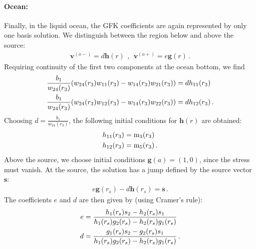\documentclass[12pt,a4paper]{article}
\begin{document}
\paragraph{Ocean:}
Finally, in the liquid ocean, the GFK coefficients are again represented by only one basis solution. We distinguish between the region below and above the source:
\begin{align}
\mathbf{v}^{(o-)} = d\mathbf{h}(r) \ \,,\ \ \mathbf{v}^{(o+)} = e\mathbf{g}(r) \,.
\end{align}
Requiring continuity of the first two components at the ocean bottom, we find
\begin{align}
\frac{b_1}{w_{24}(r_3)}  (w_{24}(r_3)w_{11}(r_3) - w_{14}(r_3) w_{21}(r_3)) &= dh_{11}(r_3) \\ \notag
\frac{b_1}{w_{24}(r_3)}  (w_{24}(r_3)w_{12}(r_3) - w_{14}(r_3) w_{22}(r_3)) &= dh_{12}(r_3)\,.
\end{align}
Choosing $d = \frac{b_1}{w_{24}(r_3)}$, the following initial conditions for $\mathbf{h}(r)$ are obtained:
\begin{align}
h_{11}(r_3) &= \mathrm{m}_3(r_3) \\\notag
h_{12}(r_3) &= \mathrm{m}_5(r_3) \,.
\end{align}
Above the source, we choose initial conditions $\mathbf{g}(a) = (1,0)$, since the stress must vanish. At the source, the solution has a jump defined by the source vector $\mathbf{s}$:
\begin{align}
e\mathbf{g}(r_s)-d\mathbf{h}(r_s) = \mathbf{s} \,.
\end{align}
The coefficients $e$ and $d$ are then given by (using Cramer's rule):
\begin{align}
e & = \frac{h_1(r_s)s_2-h_2(r_s)s_1}{h_1(r_s)g_2(r_s)-h_2(r_s)g_1(r_s)} \\ \notag
d & = \frac{g_1(r_s)s_2-g_2(r_s)s_1}{h_1(r_s)g_2(r_s)-h_2(r_s)g_1(r_s)} \,.
\end{align}
%
\end{document}
